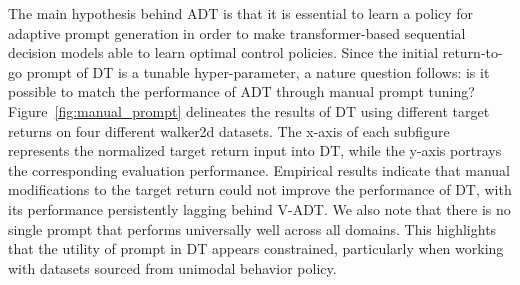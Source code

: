 The main hypothesis behind ADT is that it is essential to learn a policy for adaptive prompt generation in order to make transformer-based sequential decision models able to learn optimal control policies.  
Since the initial return-to-go prompt of DT is a tunable hyper-parameter, a nature question follows: is it possible to match the performance of ADT through manual prompt tuning?   
 Figure~\ref{fig:manual_prompt} delineates the results of DT using different target returns on four different walker2d datasets. The x-axis of each subfigure represents the normalized target return input into DT, while the y-axis portrays the corresponding evaluation performance. Empirical results indicate that manual modifications to the target return could not improve the performance of DT, with its performance persistently lagging behind V-ADT. 
 We also note that there is no single prompt that performs universally well across all domains. 
This highlights that the utility of prompt in DT appears constrained, particularly when working with datasets sourced from unimodal behavior policy. 





\iffalse

\begin{figure}[!htbp]
\texttt{[image: exp\_figs/VDT\_prompt\_engineering\_results.pdf]}
\\
\texttt{[image: exp\_figs/vdt\_noprompt\_results.pdf]}
\caption{Average normalized results of DT using different prompt. Incorporating manual prompt engineering could not help DT outperform V-ADT. }
\label{fig:manual_prompt}
\end{figure}%

\fi






